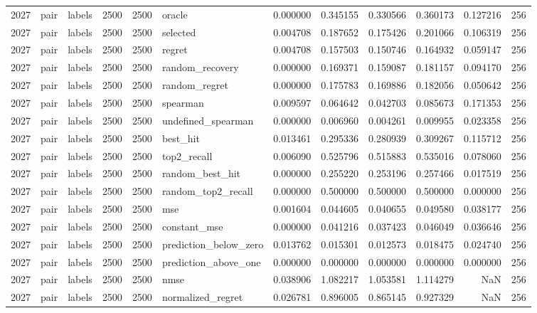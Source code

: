 \begin{tabular}{rllrrlrrrrrr}
2027 & pair & labels & 2500 & 2500 & oracle & 0.000000 & 0.345155 & 0.330566 & 0.360173 & 0.127216 & 256 \\
2027 & pair & labels & 2500 & 2500 & selected & 0.004708 & 0.187652 & 0.175426 & 0.201066 & 0.106319 & 256 \\
2027 & pair & labels & 2500 & 2500 & regret & 0.004708 & 0.157503 & 0.150746 & 0.164932 & 0.059147 & 256 \\
2027 & pair & labels & 2500 & 2500 & random_recovery & 0.000000 & 0.169371 & 0.159087 & 0.181157 & 0.094170 & 256 \\
2027 & pair & labels & 2500 & 2500 & random_regret & 0.000000 & 0.175783 & 0.169886 & 0.182056 & 0.050642 & 256 \\
2027 & pair & labels & 2500 & 2500 & spearman & 0.009597 & 0.064642 & 0.042703 & 0.085673 & 0.171353 & 256 \\
2027 & pair & labels & 2500 & 2500 & undefined_spearman & 0.000000 & 0.006960 & 0.004261 & 0.009955 & 0.023358 & 256 \\
2027 & pair & labels & 2500 & 2500 & best_hit & 0.013461 & 0.295336 & 0.280939 & 0.309267 & 0.115712 & 256 \\
2027 & pair & labels & 2500 & 2500 & top2_recall & 0.006090 & 0.525796 & 0.515883 & 0.535016 & 0.078060 & 256 \\
2027 & pair & labels & 2500 & 2500 & random_best_hit & 0.000000 & 0.255220 & 0.253196 & 0.257466 & 0.017519 & 256 \\
2027 & pair & labels & 2500 & 2500 & random_top2_recall & 0.000000 & 0.500000 & 0.500000 & 0.500000 & 0.000000 & 256 \\
2027 & pair & labels & 2500 & 2500 & mse & 0.001604 & 0.044605 & 0.040655 & 0.049580 & 0.038177 & 256 \\
2027 & pair & labels & 2500 & 2500 & constant_mse & 0.000000 & 0.041216 & 0.037423 & 0.046049 & 0.036646 & 256 \\
2027 & pair & labels & 2500 & 2500 & prediction_below_zero & 0.013762 & 0.015301 & 0.012573 & 0.018475 & 0.024740 & 256 \\
2027 & pair & labels & 2500 & 2500 & prediction_above_one & 0.000000 & 0.000000 & 0.000000 & 0.000000 & 0.000000 & 256 \\
2027 & pair & labels & 2500 & 2500 & nmse & 0.038906 & 1.082217 & 1.053581 & 1.114279 & NaN & 256 \\
2027 & pair & labels & 2500 & 2500 & normalized_regret & 0.026781 & 0.896005 & 0.865145 & 0.927329 & NaN & 256 \\

\end{tabular}

